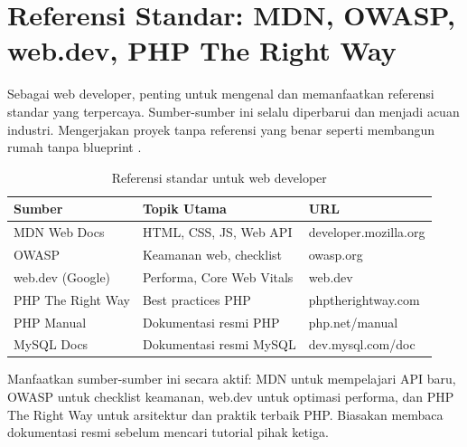 ﻿\section[Referensi Standar: MDN, OWASP, web.dev, PHP The Right Way]{Referensi Standar: MDN, OWASP, web.dev, PHP The Right Way}

Sebagai web developer, penting untuk mengenal dan memanfaatkan referensi standar yang terpercaya. Sumber-sumber ini selalu diperbarui dan menjadi acuan industri. Mengerjakan proyek tanpa referensi yang benar seperti membangun rumah tanpa blueprint \cite{phpRightWay}.

\begin{table}[H]
\centering
\begin{tabular}{|P{3cm}|P{4cm}|P{5.5cm}|}
\hline
\textbf{Sumber} & \textbf{Topik Utama} & \textbf{URL} \\
\hline
MDN Web Docs & HTML, CSS, JS, Web API & developer.mozilla.org \\
\hline
OWASP & Keamanan web, checklist & owasp.org \\
\hline
web.dev (Google) & Performa, Core Web Vitals & web.dev \\
\hline
PHP The Right Way & Best practices PHP & phptherightway.com \\
\hline
PHP Manual & Dokumentasi resmi PHP & php.net/manual \\
\hline
MySQL Docs & Dokumentasi resmi MySQL & dev.mysql.com/doc \\
\hline
\end{tabular}
\caption{Referensi standar untuk web developer}
\end{table}

Manfaatkan sumber-sumber ini secara aktif: MDN untuk mempelajari API baru, OWASP untuk checklist keamanan, web.dev untuk optimasi performa, dan PHP The Right Way untuk arsitektur dan praktik terbaik PHP. Biasakan membaca dokumentasi resmi sebelum mencari tutorial pihak ketiga.

